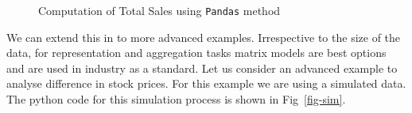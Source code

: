 \documentclass[
  letterpaper,
  DIV=11,
  numbers=noendperiod]{scrreprt}
\theoremstyle{plain}
\theoremstyle{definition}
\theoremstyle{remark}
\begin{document}
\begin{figure}[H]


\caption{\label{fig-tot2}Computation of Total Sales using
\texttt{Pandas} method}

\end{figure}%

We can extend this in to more advanced examples. Irrespective to the
size of the data, for representation and aggregation tasks matrix models
are best options and are used in industry as a standard. Let us consider
an advanced example to analyse difference in stock prices. For this
example we are using a simulated data. The python code for this
simulation process is shown in Fig~\ref{fig-sim}.
\end{document}
